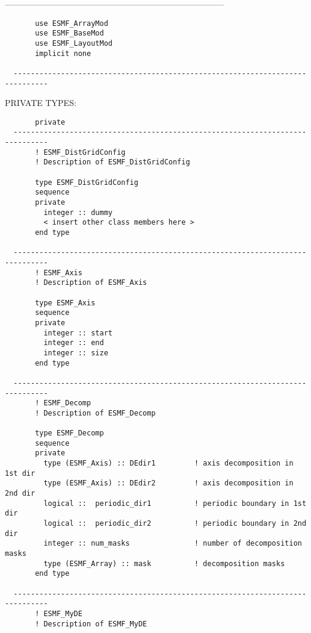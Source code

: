   ------------------------------------------------------------------------------
\begin{verbatim}       use ESMF_ArrayMod
       use ESMF_BaseMod
       use ESMF_LayoutMod
       implicit none
 
  ------------------------------------------------------------------------------\end{verbatim}{\sf PRIVATE TYPES:}
\begin{verbatim}       private
  ------------------------------------------------------------------------------
       ! ESMF_DistGridConfig
       ! Description of ESMF_DistGridConfig
 
       type ESMF_DistGridConfig
       sequence
       private
         integer :: dummy
         < insert other class members here >
       end type
 
  ------------------------------------------------------------------------------
       ! ESMF_Axis
       ! Description of ESMF_Axis
 
       type ESMF_Axis
       sequence
       private
         integer :: start
         integer :: end
         integer :: size
       end type
 
  ------------------------------------------------------------------------------
       ! ESMF_Decomp
       ! Description of ESMF_Decomp
 
       type ESMF_Decomp
       sequence
       private
         type (ESMF_Axis) :: DEdir1         ! axis decomposition in 1st dir
         type (ESMF_Axis) :: DEdir2         ! axis decomposition in 2nd dir
         logical ::  periodic_dir1          ! periodic boundary in 1st dir
         logical ::  periodic_dir2          ! periodic boundary in 2nd dir
         integer :: num_masks               ! number of decomposition masks
         type (ESMF_Array) :: mask          ! decomposition masks
       end type
 
  ------------------------------------------------------------------------------
       ! ESMF_MyDE
       ! Description of ESMF_MyDE
 

\end{verbatim}
